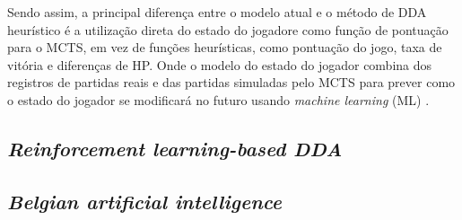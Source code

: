     Sendo assim, a principal diferença entre o modelo atual 
    e o método de DDA heurístico é a utilização direta
    do estado do jogadore como função de pontuação para
    o MCTS, em vez de funções heurísticas, como 
    pontuação do jogo, taxa de vitória e diferenças de HP.
    Onde o modelo do estado do jogador combina dos 
    registros de partidas reais e das partidas simuladas
    pelo MCTS para prever como o estado do jogador se 
    modificará no futuro usando \textit{machine learning}
    (ML) \cite{moon2022diversifying}.


    \subsection{\textit{Reinforcement learning-based DDA}}

    \subsection{\textit{Belgian artificial intelligence}}